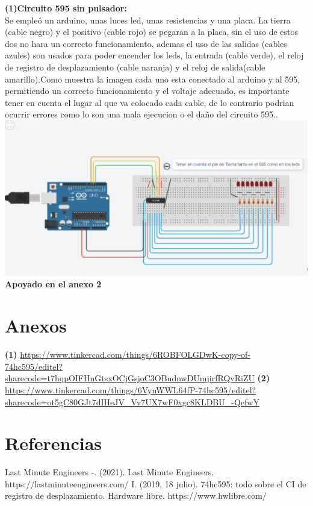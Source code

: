 \documentclass{article}
\begin{document}
\textbf{(1)Circuito 595 sin pulsador:} \\
\justify Se empleó un arduino, unas luces led, unas resistencias y una placa. La tierra (cable negro) y el positivo (cable rojo) se pegaran a la placa, sin el uso de estos dos no hara un correcto funcionamiento, ademas el uso de las salidas (cables azules) son usados para poder encender los leds, la entrada (cable verde), el reloj de registro de desplazamiento (cable naranja) y el reloj de salida(cable amarillo).Como muestra la imagen cada uno esta conectado al arduino y al 595, permitiendo un correcto funcionamiento y el voltaje adecuado, es importante tener en cuenta el lugar al que va colocado cada cable, de lo contrario podrian ocurrir errores como lo son una mala ejecucion o el daño del circuito 595..
\newline
\newline
\newline
\includegraphics[scale=0.5]{figura3.png}
\centering
\textbf{Apoyado en el anexo 2}
\newline
\newline
\newline

\newpage
\justify
\section{Anexos}
\label{Anexos}
\textbf{(1)}
\url{https://www.tinkercad.com/things/6ROBFOLGDwK-copy-of-74hc595/editel?sharecode=t7hqpOIFHnGtsxOCjGsjoC3OBudnwDUmjirfRQvRiZU}
\newline
\newline
\textbf{(2)}
\url{https://www.tinkercad.com/things/6VynWWL64fP-74hc595/editel?sharecode=ot5gC80GJt7dIHeJV_Vv7UX7wF0xgc8KLDBU_-QefwY}

\newpage
\section{Referencias}
\label{Referencias}

\justify
Last Minute Engineers -. (2021). Last Minute Engineers. https://lastminuteengineers.com/
\newline
I. (2019, 18 julio). 74hc595: todo sobre el CI de registro de desplazamiento. Hardware libre. https://www.hwlibre.com/
\end{document}
